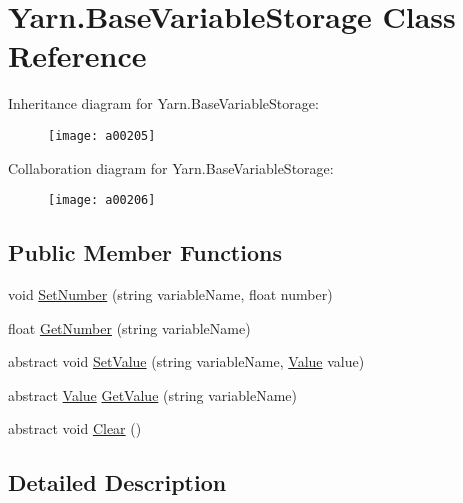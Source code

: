 \hypertarget{a00021}{\section{Yarn.\-Base\-Variable\-Storage Class Reference}
\label{a00021}
}


Inheritance diagram for Yarn.\-Base\-Variable\-Storage\-:
\nopagebreak
\begin{figure}[H]
\begin{center}
\leavevmode
\texttt{[image: a00205]}
\end{center}
\end{figure}


Collaboration diagram for Yarn.\-Base\-Variable\-Storage\-:
\nopagebreak
\begin{figure}[H]
\begin{center}
\leavevmode
\texttt{[image: a00206]}
\end{center}
\end{figure}
\subsection*{Public Member Functions}
\begin{DoxyCompactItemize}
\item 
void \hyperlink{a00021_a48b93de9cd7ae61d0cd9583c8330d3ee}{Set\-Number} (string variable\-Name, float number)
\item 
float \hyperlink{a00021_a1b7f7f4468b2463e7b47986d99362279}{Get\-Number} (string variable\-Name)
\item 
abstract void \hyperlink{a00021_a1c57d6d208b78abec0a670396771448e}{Set\-Value} (string variable\-Name, \hyperlink{a00086}{Value} value)
\item 
abstract \hyperlink{a00086}{Value} \hyperlink{a00021_a13b142df804d9842e97e628e252928e8}{Get\-Value} (string variable\-Name)
\item 
abstract void \hyperlink{a00021_a7e45c37f3662ce9f2643e306bb2b3adc}{Clear} ()
\end{DoxyCompactItemize}


\subsection{Detailed Description}


